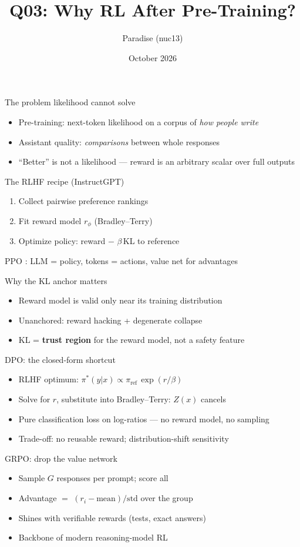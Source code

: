 \documentclass[aspectratio=169,11pt]{beamer}
\title{Q03: Why RL After Pre-Training?}
\author{Paradise (nuc13)}
\date{October 2026}
\begin{document}
\frame{\titlepage}
\begin{frame}{The problem likelihood cannot solve}
\begin{itemize}
\item Pre-training: next-token likelihood on a corpus of \emph{how people write}
\item Assistant quality: \emph{comparisons} between whole responses
\item ``Better'' is not a likelihood --- reward is an arbitrary scalar over full outputs \cite{ouyang2022training}
\end{itemize}
\end{frame}
\begin{frame}{The RLHF recipe (InstructGPT)}
\begin{enumerate}
\item Collect pairwise preference rankings
\item Fit reward model $r_\phi$ (Bradley--Terry)
\item Optimize policy: reward $-$ $\beta\,$KL to reference \cite{ouyang2022training}
\end{enumerate}
\pause PPO \cite{schulman2017ppo}: LLM = policy, tokens = actions, value net for advantages
\end{frame}
\begin{frame}{Why the KL anchor matters}
\begin{itemize}
\item Reward model is valid only near its training distribution
\item Unanchored: reward hacking + degenerate collapse
\item KL = \textbf{trust region} for the reward model, not a safety feature
\end{itemize}
\end{frame}
\begin{frame}{DPO: the closed-form shortcut}
\begin{itemize}
\item RLHF optimum: $\pi^*(y|x) \propto \pi_\text{ref}\,\exp(r/\beta)$
\item Solve for $r$, substitute into Bradley--Terry: $Z(x)$ cancels
\item Pure classification loss on log-ratios --- no reward model, no sampling \cite{rafailov2023direct}
\item Trade-off: no reusable reward; distribution-shift sensitivity
\end{itemize}
\end{frame}
\begin{frame}{GRPO: drop the value network}
\begin{itemize}
\item Sample $G$ responses per prompt; score all
\item Advantage $=$ $(r_i - \text{mean})/\text{std}$ over the group \cite{shao2025deepseekmath}
\item Shines with verifiable rewards (tests, exact answers)
\item Backbone of modern reasoning-model RL
\end{itemize}
\end{frame}
\end{document}
